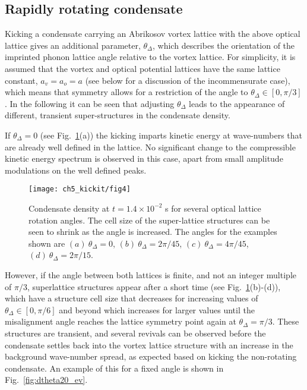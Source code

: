 \subsection{Rapidly rotating condensate}

    Kicking a condensate carrying an Abrikosov vortex lattice with the above optical lattice gives an additional parameter, $\theta_\Delta$, which describes the orientation of the imprinted phonon lattice angle relative to the vortex lattice. For simplicity, it is assumed that the vortex and optical potential lattices have the same lattice constant, $a_v=a_o=a$ (see below for a discussion of the incommensurate case), which means that symmetry allows for a restriction of the angle to $\theta_\Delta\in[0,\pi/3]$. In the following it can be seen that adjusting $\theta_\Delta$ leads to the appearance of different, transient super-structures in the condensate density.

    If $\theta_\Delta=0$ (see Fig.~\ref{fig:moire_density}(a)) the kicking imparts kinetic energy at wave-numbers that are already well defined in the lattice. No significant change to the compressible kinetic energy spectrum is observed in this case, apart from small amplitude modulations on the well defined peaks.

	\begin{figure}
        \centering
			\texttt{[image: ch5\_kickit/fig4]}
			\caption[Effect of kicking on condensate with a large vortex lattice.]{Condensate density at $t=1.4\times10^{-2}$ s for several optical lattice rotation angles. The cell size of the super-lattice structures can be seen to shrink as the angle is increased. The angles for the examples shown are $(a)~\theta_\Delta=0$, $(b)~\theta_\Delta=2\pi/45$, $(c)~\theta_\Delta=4\pi/45$, $(d)~\theta_\Delta=2\pi/15$. }
			\label{fig:moire_density}
		\end{figure}

    However, if the angle between both lattices is finite, and not an integer multiple of $\pi/3$, superlattice structures appear after a short time (see Fig.~\ref{fig:moire_density}(b)-(d)), which have a structure cell size that decreases for increasing values of $\theta_\Delta\in[0,\pi/6]$ and beyond which increases for larger values until the misalignment angle reaches the lattice symmetry point again at $\theta_\Delta=\pi/3$. These structures are transient, and several revivals can be observed before the condensate settles back into the vortex lattice structure with an increase in the background wave-number spread, as expected based on kicking the non-rotating condensate. An example of this for a fixed angle is shown in Fig.~\ref{fig:dtheta20_ev}.

